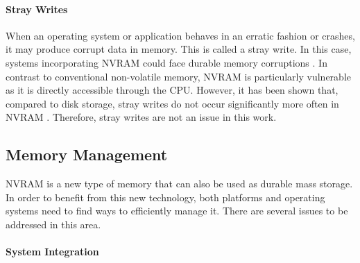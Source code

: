 \paragraph{Stray Writes}

When an operating system or application behaves in an erratic fashion or
crashes, it may produce corrupt data in memory. This is called a stray write. In
this case, systems incorporating \ac{NVRAM} could face durable memory
corruptions \cite{condit2009better, venkataraman2011consistent, dulloor2014system}. In contrast to
conventional non-volatile memory, \ac{NVRAM} is particularly vulnerable as it is
directly accessible through the \ac{CPU}. However, it has been shown that,
compared to disk storage, stray writes do not occur significantly more often in
\ac{NVRAM} \cite{chen1996rio}. Therefore, stray writes are not an issue in this
work.


\subsection{Memory Management}

\ac{NVRAM} is a new type of memory that can also be used as durable mass
storage. In order to benefit from this new technology, both platforms and
operating systems need to find ways to efficiently manage it. There are several
issues to be addressed in this area.


\paragraph{System Integration}

